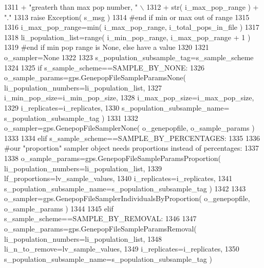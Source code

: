 \begin{DoxyCode}
1311                         + \textcolor{stringliteral}{"greaterh than max pop number, "} \(\backslash\)
1312                         + str( i\_max\_pop\_range ) + \textcolor{stringliteral}{"."} 
1313             \textcolor{keywordflow}{raise} Exception( s\_msg )
1314         \textcolor{comment}{#end if min or max out of range}
1315 
1316         i\_max\_pop\_range=min( i\_max\_pop\_range, i\_total\_pops\_in\_file )
1317 
1318         li\_population\_list=range( i\_min\_pop\_range, i\_max\_pop\_range + 1 )
1319     \textcolor{comment}{#end if min pop range is None, else have a value}
1320 
1321     o\_sampler=\textcolor{keywordtype}{None}  
1322 
1323     s\_population\_subsample\_tag=s\_sample\_scheme
1324 
1325     \textcolor{keywordflow}{if} s\_sample\_scheme==SAMPLE\_BY\_NONE:
1326         o\_sample\_params=gps.GenepopFileSampleParamsNone( li\_population\_numbers=li\_population\_list,
1327                                                             i\_min\_pop\_size=i\_min\_pop\_size,
1328                                                             i\_max\_pop\_size=i\_max\_pop\_size,
1329                                                             i\_replicates=i\_replicates,
1330                                                             s\_population\_subsample\_name=
      s\_population\_subsample\_tag )    
1331 
1332         o\_sampler=gps.GenepopFileSamplerNone( o\_genepopfile, o\_sample\_params )
1333 
1334     \textcolor{keywordflow}{elif} s\_sample\_scheme==SAMPLE\_BY\_PERCENTAGES:
1335 
1336         \textcolor{comment}{#our "proportion" sampler object needs proportions instead of percentages:}
1337 
1338         o\_sample\_params=gps.GenepopFileSampleParamsProportion( li\_population\_numbers=li\_population\_list,
1339                                                 lf\_proportions=lv\_sample\_values,
1340                                                 i\_replicates=i\_replicates,
1341                                                 s\_population\_subsample\_name=s\_population\_subsample\_tag )
1342 
1343         o\_sampler=gps.GenepopFileSamplerIndividualsByProportion( o\_genepopfile, o\_sample\_params )
1344 
1345     \textcolor{keywordflow}{elif} s\_sample\_scheme==SAMPLE\_BY\_REMOVAL:
1346 
1347         o\_sample\_params=gps.GenepopFileSampleParamsRemoval( li\_population\_numbers=li\_population\_list,
1348                                                 li\_n\_to\_remove=lv\_sample\_values,
1349                                                 i\_replicates=i\_replicates,
1350                                                 s\_population\_subsample\_name=s\_population\_subsample\_tag )

\end{DoxyCode}
